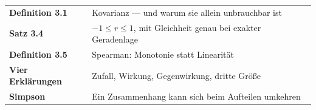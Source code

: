 \begin{merksatz}
\begin{center}
\renewcommand{\arraystretch}{1.5}
\begin{tabular}{@{}P{3.0cm}P{5.6cm}@{}}
\toprule
\textbf{Definition 3.1} & Kovarianz --- und warum sie allein unbrauchbar ist\\
\textbf{Satz 3.4} & $-1 \le r \le 1$, mit Gleichheit genau bei exakter Geradenlage\\
\textbf{Definition 3.5} & Spearman: Monotonie statt Linearität\\
\textbf{Vier Erklärungen} & Zufall, Wirkung, Gegenwirkung, dritte Größe\\
\textbf{Simpson} & Ein Zusammenhang kann sich beim Aufteilen umkehren\\
\bottomrule
\end{tabular}
\end{center}

\begin{center}
\begin{minipage}{0.88\textwidth}
\end{minipage}
\end{center}
\end{merksatz}
